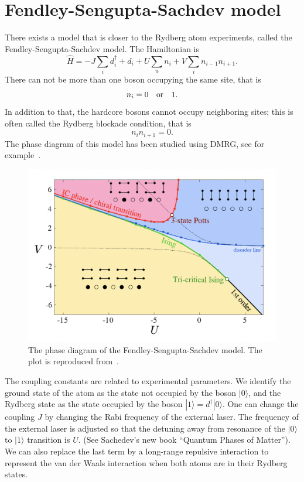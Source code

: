 \documentclass[prb,twocolumn,11pt]{revtex4-1}
\begin{document}
\section{Fendley-Sengupta-Sachdev model}
There exists a model that is closer to the Rydberg atom experiments, called the Fendley-Sengupta-Sachdev model. The Hamiltonian is 
\begin{equation}
    \hat{H}=-J \sum_i d_i^{\dagger}+d_i+ U \sum_u n_i + V \sum_i n_{i-1}n_{i+1}.
\end{equation}
There can not be more than one boson occupying the same site, that is 
\begin{equation}
    n_i=0\quad {\rm or} \quad 1.
\end{equation}
In addition to that, the hardcore bosons cannot occupy neighboring sites; this is often called the Rydberg blockade condition, that is 
\begin{equation}
    n_i n_{i+1}=0.
\end{equation}
The phase diagram of this model has been studied using DMRG, see for example~\cite{10.21468/SciPostPhys.6.3.033}.
\begin{figure}[htbp]
\centering
\includegraphics[scale=0.5]{phase_diagram.png}
\caption{The phase diagram of the Fendley-Sengupta-Sachdev model. The plot is reproduced from~\cite{10.21468/SciPostPhys.6.3.033}. }
\label{phasediagram}
\end{figure}
The coupling constants are related to experimental parameters. We identify the ground state of the atom as the state not occupied by the boson $|0\rangle$, and the Rydberg state as the state occupied by the boson $|1\rangle=d^{\dagger}|0\rangle$. 
One can change the coupling $J$ by changing the Rabi frequency of the external laser.
The frequency of the external laser is adjusted so that the detuning away from resonance of the $|0\rangle$ to $|1\rangle$ transition is $U$. 
(See Sachedev's new book ``Quantum Phases of Matter''). We can also replace the last term by a long-range repulsive interaction to represent the van der Waals interaction
when both atoms are in their Rydberg states.
\end{document}
